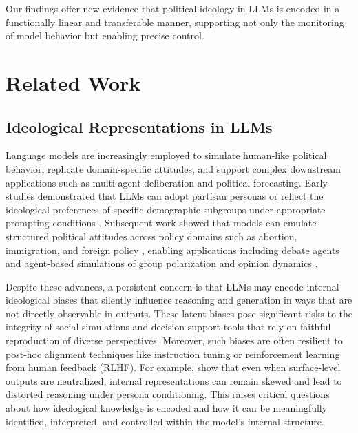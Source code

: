 \documentclass[11pt]{article}
\begin{document}
Our findings offer new evidence that political ideology in LLMs is encoded in a functionally linear and transferable manner, supporting not only the monitoring of model behavior but enabling precise control.

\section{Related Work}

\subsection{Ideological Representations in LLMs}

Language models are increasingly employed to simulate human-like political behavior, replicate domain-specific attitudes, and support complex downstream applications such as multi-agent deliberation and political forecasting. Early studies demonstrated that LLMs can adopt partisan personas or reflect the ideological preferences of specific demographic subgroups under appropriate prompting conditions \citep{argyleOutOneMany2023, motokiMoreHumanHuman2024, potterHiddenPersuadersLLMs2024}. Subsequent work showed that models can emulate structured political attitudes across policy domains such as abortion, immigration, and foreign policy \citep{wuLargeLanguageModels2023a, ohaganMeasurementAgeLLMs2023}, enabling applications including debate agents \citep{costelloDurablyReducingConspiracy2024} and agent-based simulations of group polarization and opinion dynamics \citep{parkLinearRepresentationHypothesis2024, tornbergSimulatingSocialMedia2023, mouUnveilingTruthFacilitating2024}.

Despite these advances, a persistent concern is that LLMs may encode internal ideological biases that silently influence reasoning and generation in ways that are not directly observable in outputs. These latent biases pose significant risks to the integrity of social simulations and decision-support tools that rely on faithful reproduction of diverse perspectives. Moreover, such biases are often resilient to post-hoc alignment techniques like instruction tuning or reinforcement learning from human feedback (RLHF). For example, \citet{guptaBiasRunsDeep2023} show that even when surface-level outputs are neutralized, internal representations can remain skewed and lead to distorted reasoning under persona conditioning. This raises critical questions about how ideological knowledge is encoded and how it can be meaningfully identified, interpreted, and controlled within the model’s internal structure.
\end{document}
